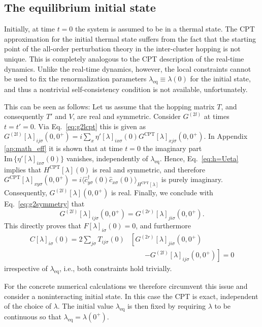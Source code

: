 \documentclass[twocolumn,prb,showpacs,aps,superscriptaddress]{revtex4}
\newcommand{\cd}[1]{\ensuremath{\hat{c}^\dagger_{#1}}}
\newcommand{\cc}[1]{\ensuremath{\hat{c}_{#1}}}
\newcommand{\est}[1]{\ensuremath{\langle {#1} \rangle}}
\begin{document}
\subsection{The equilibrium initial state}
\label{sec:initial_state}

Initially, at time $t=0$ the system is assumed to be in a thermal state.  The
CPT approximation for the initial thermal state suffers from the fact that the
starting point of the all-order perturbation theory in the inter-cluster
hopping is not unique.  This is completely analogous to the CPT description of
the real-time dynamics.  Unlike the real-time dynamics, however, the local 
constraints cannot be used to fix the renormalization parameters
$\lambda_\mathrm{eq}\equiv \lambda(0)$ for the initial state, and thus a
nontrivial self-consistency condition is not available, unfortunately.

This can be seen as follows: Let us assume that the hopping matrix $T$, and
consequently $T'$ and $V$, are real and symmetric.  Consider $G^{(2l)}$ at
times $t=t'=0$.  Via Eq.\ \eqref{eq:g2lcpt} this is given as
$G^{(2l)}[\lambda]_{ij\sigma}(0,0^+) = i\sum_{x} \eta'[\lambda]_{ix\sigma}(0)
G^\text{CPT}[\lambda]_{xj\sigma}(0,0^+)$.  In Appendix \ref{ap:math_eff} it is
shown that at time $t=0$ the imaginary part $\mathrm{Im}\,\{
\eta'[\lambda]_{ix\sigma}(0)\}$ vanishes, independently of
$\lambda_\mathrm{eq}$.  Hence, Eq.\  \eqref{eq:h=Ueta} implies that
$H^\text{CPT}[\lambda](0)$ is real and symmetric, and therefore
$G^\text{CPT}[\lambda]_{xy\sigma}(0,0^+) = i\est{\cd{y\sigma}(0)
\cc{x\sigma}(0)}_{H^\text{CPT}[\lambda]}$ is purely imaginary.  Consequently,
$G^{(2l)}[\lambda](0,0^+)$ is real.  Finally, we conclude with Eq.\
\eqref{eq:g2symmetry} that
\begin{equation}
  G^{(2l)}[\lambda]_{ij\sigma}(0,0^+) = G^{(2r)}[\lambda]_{ji\sigma}(0,0^+).
\end{equation}
This directly proves that $F[\lambda]_{i\sigma}(0)=0$, and furthermore
\begin{align}
  C[\lambda]_{i\sigma}(0)
  =
  2\sum_{j\sigma}
  T_{ij\sigma}(0)
  &\left[
    G^{(2r)}[\lambda]_{ji\sigma}(0,0^+)
  \right.\\
  &\quad\quad
  \left.
    -
    G^{(2l)}[\lambda]_{ij\sigma}(0,0^+)
  \right]
  =
  0
  \nonumber 
\end{align}
irrespective of $\lambda_\mathrm{eq}$, i.e., both constraints hold
trivially. 

For the concrete numerical
calculations we therefore circumvent this issue and consider a noninteracting initial
state. In this case the CPT is exact, independent of the choice of $\lambda$.
The initial value $\lambda_\mathrm{eq}$ is then fixed by requiring $\lambda$ to
be continuous so that $\lambda_\mathrm{eq} = \lambda(0^+)$. 
\end{document}
